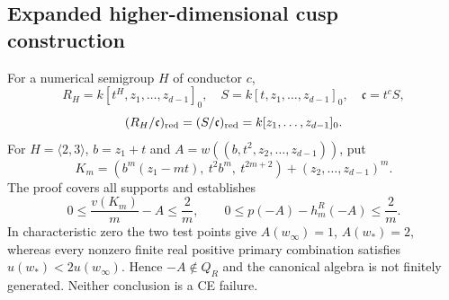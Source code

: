 \subsection*{Expanded higher-dimensional cusp construction}
For a numerical semigroup $H$ of conductor $c$,
\[
R_H=k[t^H,z_1,\ldots,z_{d-1}]_0,\quad
S=k[t,z_1,\ldots,z_{d-1}]_0,\quad\mathfrak c=t^cS,
\]
\[
(R_H/\mathfrak c)_{\rm red}=(S/\mathfrak c)_{\rm red}=k[z_1,\ldots,z_{d-1}]_0.
\]
For $H=\langle2,3\rangle$, $b=z_1+t$ and
$A=w((b,t^2,z_2,\ldots,z_{d-1}))$, put
\[
K_m=(b^m(z_1-mt),\ t^2b^m,\ t^{2m+2})+(z_2,\ldots,z_{d-1})^m.
\]
The proof covers all supports and establishes
\[
0\leq \frac{v(K_m)}m-A\leq\frac2m,\qquad
0\leq p(-A)-h_m^R(-A)\leq\frac2m.
\]
In characteristic zero the two test points give $A(w_\infty)=1$,
$A(w_*)=2$, whereas every nonzero finite real positive primary combination
satisfies $u(w_*)<2u(w_\infty)$. Hence $-A\notin Q_R$ and the canonical
algebra is not finitely generated. Neither conclusion is a CE failure.

